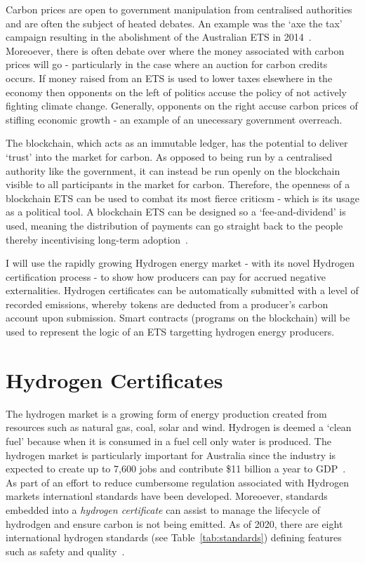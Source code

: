 Carbon prices are open to government manipulation from centralised
authorities and are often the subject of heated debates. An example
was the `axe the tax' campaign resulting in the abolishment of
the Australian ETS in 2014~\cite{EconE}. Moreoever, there is often
debate over where the money associated with carbon prices will go
- particularly in the case where an auction for carbon credits occurs.
If money raised from an ETS is used to lower taxes elsewhere in the economy then
opponents on the left of politics accuse the policy of not actively
fighting climate change. Generally, opponents on the right accuse carbon
prices of stifling economic growth - an example of an unecessary
government overreach.

The blockchain, which acts as an immutable ledger, has the potential to
deliver `trust' into the market for carbon. As opposed to being run
by a centralised authority like the government, it can instead be run
openly on the blockchain visible to all participants in the market for
carbon. Therefore, the openness of a blockchain ETS can be used to combat
its most fierce criticsm - which is its usage as a political tool.
A blockchain ETS can be designed so a `fee-and-dividend' is used, meaning
the distribution of payments can go straight back to the people thereby
incentivising long-term adoption~\cite{EconE}.

I will use the rapidly growing Hydrogen energy market - with its novel Hydrogen
certification process - to show how producers can pay for accrued
negative externalities. Hydrogen certificates can be automatically
submitted with a level of recorded emissions, whereby tokens are deducted
from a producer's carbon account upon submission. Smart contracts
(programs on the blockchain) will be used to represent the logic
of an ETS targetting hydrogen energy producers.

\section{Hydrogen Certificates}
The hydrogen market is a growing form of energy production created
from resources such as natural gas, coal, solar and wind. Hydrogen is
deemed a `clean fuel' because when it is consumed in a fuel cell
only water is produced. The hydrogen market is particularly important
for Australia since the industry is expected to create up to 7,600 jobs
and contribute \$11 billion a year to GDP~\cite{coag}. As part of an
effort to reduce cumbersome regulation associated with Hydrogen
markets internationl standards have been developed. Moreoever,
standards embedded into a \textit{hydrogen certificate} can
assist to manage the lifecycle of hydrodgen and ensure carbon
is not being emitted. As of 2020, there are eight international
hydrogen standards (see Table~\ref{tab:standards})
defining features such as safety and quality~\cite{stan}.

